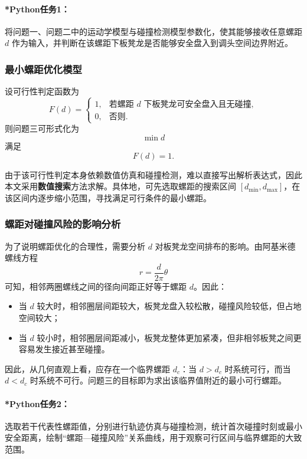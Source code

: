 \documentclass[12pt,a4paper]{ctexart}
\begin{document}
\paragraph{*Python任务1：}
将问题一、问题二中的运动学模型与碰撞检测模型参数化，使其能够接收任意螺距 $d$ 作为输入，并判断在该螺距下板凳龙是否能够安全盘入到调头空间边界附近。

\subsubsection{最小螺距优化模型}
设可行性判定函数为
\begin{equation}
F(d)=
\begin{cases}
1, & \text{若螺距 } d \text{ 下板凳龙可安全盘入且无碰撞},\\
0, & \text{否则}.
\end{cases}
\end{equation}
则问题三可形式化为
\begin{equation}
\min d
\end{equation}
满足
\begin{equation}
F(d)=1.
\end{equation}

由于该可行性判定本身依赖数值仿真和碰撞检测，难以直接写出解析表达式，因此本文采用\textbf{数值搜索}方法求解。具体地，可先选取螺距的搜索区间 $[d_{\min},d_{\max}]$，在该区间内逐步缩小范围，寻找满足可行条件的最小螺距。

\subsubsection{螺距对碰撞风险的影响分析}
为了说明螺距优化的合理性，需要分析 $d$ 对板凳龙空间排布的影响。由阿基米德螺线方程
\[
r=\frac{d}{2\pi}\theta
\]
可知，相邻两圈螺线之间的径向间距正好等于螺距 $d$。因此：

\begin{itemize}
    \item 当 $d$ 较大时，相邻圈层间距较大，板凳龙盘入较松散，碰撞风险较低，但占地空间较大；
    \item 当 $d$ 较小时，相邻圈层间距减小，板凳龙整体更加紧凑，但非相邻板凳之间更容易发生接近甚至碰撞。
\end{itemize}

因此，从几何直观上看，应存在一个临界螺距 $d_c$：当 $d>d_c$ 时系统可行，而当 $d<d_c$ 时系统不可行。问题三的目标即为求出该临界值附近的最小可行螺距。

\paragraph{*Python任务2：}
选取若干代表性螺距值，分别进行轨迹仿真与碰撞检测，统计首次碰撞时刻或最小安全距离，绘制“螺距—碰撞风险”关系曲线，用于观察可行区间与临界螺距的大致范围。
\end{document}
